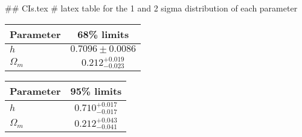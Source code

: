 ## CIs.tex
# latex table for the 1 and 2 sigma distribution of each parameter

\begin{tabular} { l  c}
 Parameter &  68\% limits\\
\hline
{\boldmath$h              $} & $0.7096\pm 0.0086          $\\
{\boldmath$\Omega_m       $} & $0.212^{+0.019}_{-0.023}   $\\
\hline
\end{tabular}

\begin{tabular} { l  c}
 Parameter &  95\% limits\\
\hline
{\boldmath$h              $} & $0.710^{+0.017}_{-0.017}   $\\
{\boldmath$\Omega_m       $} & $0.212^{+0.043}_{-0.041}   $\\
\hline
\end{tabular}

